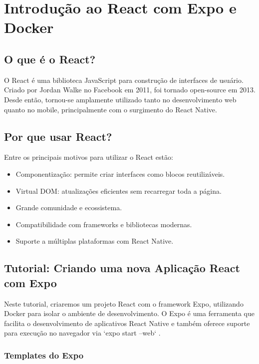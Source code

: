 \chapter{Introdução ao React com Expo e Docker}

\section{O que é o React?}



O React é uma biblioteca JavaScript para construção de interfaces de usuário. Criado por Jordan Walke no Facebook em 2011, foi tornado open-source em 2013. Desde então, tornou-se amplamente utilizado tanto no desenvolvimento web quanto no mobile, principalmente com o surgimento do React Native.


\section{Por que usar React?}

Entre os principais motivos para utilizar o React estão:

\begin{itemize}
  \item Componentização: permite criar interfaces como blocos reutilizáveis.
  \item Virtual DOM: atualizações eficientes sem recarregar toda a página.
  \item Grande comunidade e ecossistema.
  \item Compatibilidade com frameworks e bibliotecas modernas.
  \item Suporte a múltiplas plataformas com React Native.
\end{itemize}

\section{Tutorial: Criando uma nova Aplicação React com Expo}

Neste tutorial, criaremos um projeto React com o framework Expo, utilizando Docker para isolar o ambiente de desenvolvimento. O Expo é uma ferramenta que facilita o desenvolvimento de aplicativos React Native e também oferece suporte para execução no navegador via `expo start --web` \cite{reactCreatingApp,expoTutorial}.

\subsection{Templates do Expo}

